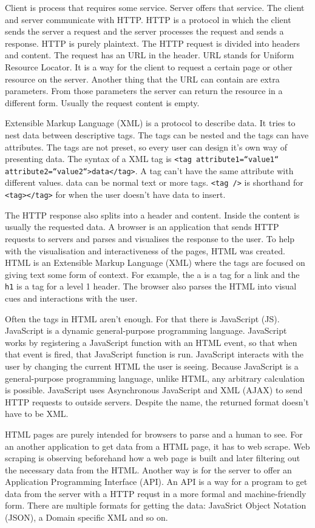 Client is process that requires some service. Server offers that service. The client and server communicate with HTTP. HTTP is a protocol in which the client sends the server a request and the server processes the request and sends a response. HTTP is purely plaintext. The HTTP request is divided into headers and content. The request has an URL in the header. URL stands for Uniform Resource Locator. It is a way for the client to request a certain page or other resource on the server. Another thing that the URL can contain are extra parameters. From those parameters the server can return the resource in a different form. Usually the request content is empty.

Extensible Markup Language (XML) is a protocol to describe data. It tries to nest data between descriptive tags. The tags can be nested and the tags can have attributes. The tags are not preset, so every user can design it's own way of presenting data. The syntax of a XML tag is \texttt{<tag attribute1=“value1“ attribute2=“value2“>data</tag>}. A tag can't have the same attribute with different values. data can be normal text or more tags. \texttt{<tag />} is shorthand for \texttt{<tag></tag>} for when the user doesn't have data to insert.

The HTTP response also splits into a header and content. Inside the content is usually the requested data. A browser is an application that sends HTTP requests to servers and parses and visualises the response to the user. To help with the visualisation and interactiveness of the pages, HTML was created. HTML is an Extensible Markup Language (XML) where the tags are focused on giving text some form of context. For example, the a is a tag for a link and the \texttt{h1} is a tag for a level 1 header. The browser also parses the HTML into visual cues and interactions with the user.

Often the tags in HTML aren't enough. For that there is JavaScript (JS). JavaScript is a dynamic general-purpose programming language. JavaScript works by registering a JavaScript function with an HTML event, so that when that event is fired, that JavaScript function is run. JavaScript interacts with the user by changing the current HTML the user is seeing. Because JavaScript is a general-purpose programming language, unlike HTML, any arbitrary calculation is possible. JavaScript uses Asynchronous JavaScript and XML (AJAX) to send HTTP requests to outside servers. Despite the name, the returned format doesn't have to be XML.

HTML pages are purely intended for browsers to parse and a human to see. For an another application to get data from a HTML page, it has to web scrape. Web scraping is observing beforehand how a web page is built and later filtering out the necessary data from the HTML. Another way is for the server to offer an Application Programming Interface (API). An API is a way for a program to get data from the server with a HTTP requst in a more formal and machine-friendly form. There are multiple formats for getting the data: JavaSrict Object Notation (JSON), a Domain specific XML and so on.

